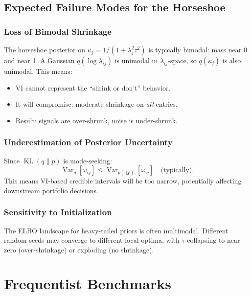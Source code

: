 \documentclass[11pt,a4paper]{article}
\newcommand{\Var}{\operatorname{Var}}
\newcommand{\KL}{\operatorname{KL}}
\begin{document}
\subsection{Expected Failure Modes for the Horseshoe}

\subsubsection{Loss of Bimodal Shrinkage}

The horseshoe posterior on $\kappa_j = 1/(1+\lambda_j^2\tau^2)$ is typically bimodal: mass near 0 and near 1. A Gaussian $q(\log\lambda_{ij})$ is unimodal in $\lambda_{ij}$-space, so $q(\kappa_j)$ is also unimodal. This means:

\begin{itemize}[nosep]
  \item VI cannot represent the ``shrink or don't'' behavior.
  \item It will compromise: moderate shrinkage on \emph{all} entries.
  \item Result: signals are over-shrunk, noise is under-shrunk.
\end{itemize}

\subsubsection{Underestimation of Posterior Uncertainty}

Since $\KL(q\|p)$ is mode-seeking:
\begin{equation}
  \Var_q[\omega_{ij}] \leq \Var_{p(\cdot|\bm{y})}[\omega_{ij}] \quad \text{(typically)}.
\end{equation}
This means VI-based credible intervals will be too narrow, potentially affecting downstream portfolio decisions.

\subsubsection{Sensitivity to Initialization}

The ELBO landscape for heavy-tailed priors is often multimodal. Different random seeds may converge to different local optima, with $\tau$ collapsing to near-zero (over-shrinkage) or exploding (no shrinkage).


\section{Frequentist Benchmarks}\label{sec:freq}
\end{document}
